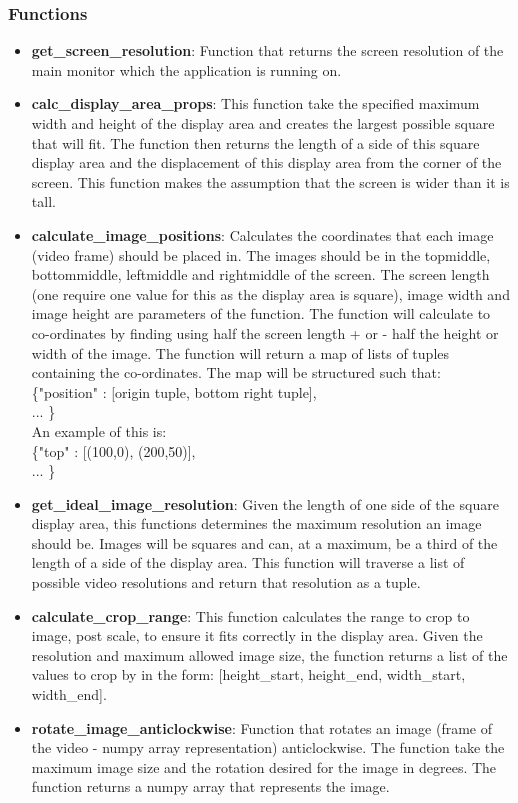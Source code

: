 \documentclass{article}
\begin{document}
\subsubsection{Functions}

\begin{itemize}
	\item \textbf{get\_screen\_resolution}: Function that returns the screen resolution of the main monitor which the application is running on.

	\item \textbf{calc\_display\_area\_props}: This function take the specified maximum width and height of the display area and creates the largest possible square that will fit. The function then returns the length of a side of this square display area and the displacement of this display area from the corner of the screen. This function makes the assumption that the screen is wider than it is tall.
	
	\item \textbf{calculate\_image\_positions}: Calculates the co\-ordinates that each image (video frame) should be placed in. The images should be in the top\-middle, bottom\-middle, left\-middle and right\-middle of the screen. The screen length (one require one value for this as the display area is square), image width and image height are parameters of the function. The function will calculate to co-ordinates by finding using half the screen length + or - half the height or width of the image. The function will return a map of lists of tuples containing the co-ordinates. The map will be structured such that: \\
	\{"position" : [origin tuple, bottom right tuple],\\... \} \\
	An example of this is: \\
	\{"top" : [(100,0), (200,50)],\\... \}	
	
	\item \textbf{get\_ideal\_image\_resolution}: Given the length of one side of the square display area, this functions determines the maximum resolution an image should be. Images will be squares and can, at a maximum, be a third of the length of a side of the display area. This function will traverse a list of possible video resolutions and return that resolution as a tuple.
	
	\item \textbf{calculate\_crop\_range}: This function calculates the range to crop to image, post scale, to ensure it fits correctly in the display area. Given the resolution and maximum allowed image size, the function returns a list of the values to crop by in the form: [height\_start, height\_end, width\_start, width\_end].
	
	\item \textbf{rotate\_image\_anticlockwise}: Function that rotates an image (frame of the video - numpy array representation) anticlockwise. The function take the maximum image size and the rotation desired for the image in degrees. The function returns a numpy array that represents the image. 

\end{itemize}
\end{document}
